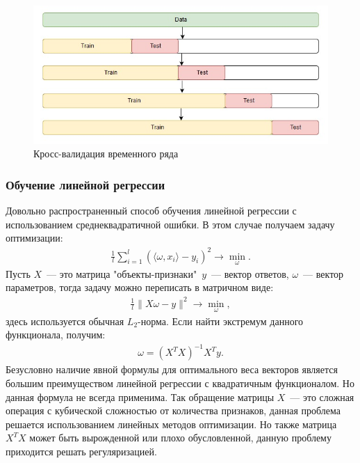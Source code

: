 \documentclass[12pt,a4paper]{article} %
\begin{document}
\begin{figure}[h]
	
	\centering
	
	\includegraphics[width=0.7\linewidth]{tcross_val.jpg}
	
	\caption{Кросс-валидация временного ряда}
	
	\label{fig:tcross_val}
	
\end{figure}

\subsubsection{Обучение линейной регрессии}

Довольно распространенный способ обучения линейной регрессии с использованием среднеквадратичной ошибки. В этом случае получаем задачу оптимизации:
 \begin{gather}\label{linreglearn1}
	\frac{1}{l}\sum\limits_{i=1}^{l}(\langle\omega, x_i\rangle - y_i)^2 \rightarrow \min_{\omega}.
\end{gather}
Пусть $X$~--- это матрица "объекты-признаки"\, $y$~--- вектор ответов, $\omega$~--- вектор параметров, тогда задачу можно переписать в матричном виде:
 \begin{gather}\label{linreglearn2}
	\frac{1}{l}\|X\omega - y\|^2 \rightarrow \min_{\omega},
\end{gather}
здесь используется обычная $L_2$-норма. Если найти экстремум данного функционала, получим:
 \begin{gather}\label{linreglearn3}
	\omega = (X^TX)^{-1}X^Ty.
\end{gather}
Безусловно наличие явной формулы для оптимального веса векторов является большим преимуществом линейной регрессии с квадратичным функционалом. Но данная формула не всегда применима. Так обращение матрицы $X$~--- это сложная операция с кубической сложностью от количества признаков, данная проблема решается использованием линейных методов оптимизации. Но также матрица $X^TX$ может быть вырожденной или плохо обусловленной, данную проблему приходится решать регуляризацией.
\end{document}

